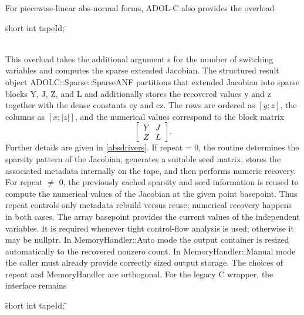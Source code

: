 \documentclass[11pt,twoside]{article}
\begin{document}
%
For piecewise-linear abs-normal forms, ADOL-C also provides the overload
\begin{tabbing}
\hspace{0.5in}\={\sf short int tapeId;} \hspace{1.2in}\= \kill
{}\\
\\
\end{tabbing}
This overload takes the additional argument {\sf s} for the number of
switching variables and computes the sparse extended Jacobian. The structured
result object {\sf ADOLC::Sparse::SparseANF} partitions that extended Jacobian
into sparse blocks {\sf Y}, {\sf J}, {\sf Z}, and {\sf L} and additionally
stores the recovered values {\sf y} and {\sf z} together with the dense
constants {\sf cy} and {\sf cz}. The rows are ordered as $[y;z]$, the columns
as $[x;|z|]$, and the numerical values correspond to the block matrix
\[
  \left[\begin{array}{cc}
    Y & J\\ Z & L
  \end{array}\right].
\]
Further details are given in \autoref{absdrivers}.
%
If {\sf repeat = 0}, the routine determines the sparsity pattern of the
Jacobian, generates a suitable seed matrix, stores the associated metadata
internally on the tape, and then performs numeric recovery.
%
For {\sf repeat $\neq$ 0}, the previously cached sparsity and seed
information is reused to compute the numerical values of
the Jacobian at the given point {\sf basepoint}.  Thus {\sf repeat} controls
only metadata rebuild versus reuse; numerical recovery happens in both cases.
%
The array {\sf basepoint} provides the current values of the independent
variables. It is required whenever tight control-flow analysis is
used; otherwise it may be {\sf nullptr}.
%
In {\sf MemoryHandler::Auto} mode the output container is resized
automatically to the recovered nonzero count. In {\sf MemoryHandler::Manual}
mode the caller must already provide correctly sized output storage. The
choices of {\sf repeat} and {\sf MemoryHandler} are orthogonal.
%
For the legacy C wrapper, the interface remains
\begin{tabbing}
\hspace{0.5in}\={\sf short int tapeId;} \hspace{1.2in}\= \kill
{}\\
\\
\end{tabbing}
\end{document}
